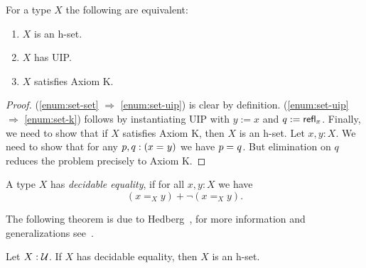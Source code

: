 \begin{thm}\label{thm:h-set-uip-K}
 For a type $X$ the following are equivalent:
 \begin{enumerate}
  \item\label{enum:set-set} $X$ is an h-set.
  \item\label{enum:set-uip} $X$ has UIP.
  \item\label{enum:set-k} $X$ satisfies Axiom K.
 \end{enumerate}
\end{thm}

\begin{proof} (\ref{enum:set-set} $\Rightarrow$ \ref{enum:set-uip}) is clear by definition. (\ref{enum:set-uip} $\Rightarrow$ \ref{enum:set-k}) follows by instantiating UIP with $y := x$ and $q := \mathsf{refl}_{x}$.
Finally, we need to show that if $X$ satisfies Axiom K, then $X$ is an h-set. Let $x, y : X$. We need to show that for any $p, q : (x =_{} y)$ we have $p =_{} q$. But elimination on $q$ reduces the problem precisely to Axiom K.
\end{proof}

\begin{defn}
 A type $X$ has {\em decidable equality}, if for all $x, y : X$ we have
 \[(x =_X y) + \neg (x =_X y).\]
\end{defn}

The following theorem is due to Hedberg~\cite{hedberg1998coherence}, for more information and generalizations
see~\cite{krausgeneralizations}.
\begin{thm}
 Let $X : \mathcal{U}$. If $X$ has decidable equality, then $X$ is an h-set.
\end{thm}


